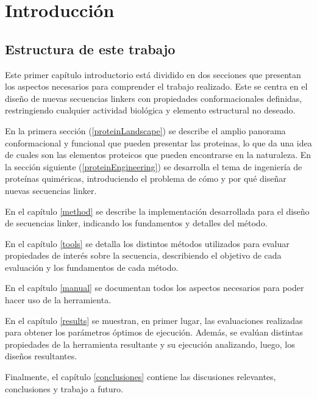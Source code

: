 \chapter{Introducci\'on}



\section{Estructura de este trabajo}

Este primer capítulo introductorio está dividido en dos secciones que presentan los aspectos necesarios para comprender el trabajo realizado. Este se centra en el diseño de nuevas secuencias linkers 
con propiedades conformacionales definidas, restringiendo cualquier actividad biológica y elemento estructural no deseado.

En la primera sección (\ref{proteinLandscape}) se describe el amplio panorama conformacional y funcional que pueden presentar las proteinas, lo que da una idea de cuales son las elementos proteicos que pueden encontrarse en la naturaleza.
En la sección siguiente (\ref{proteinEngineering}) se desarrolla el tema de ingeniería de proteínas quiméricas, introduciendo el problema de cómo y por qué diseñar nuevas secuencias linker.

En el capítulo \ref{method} se describe la implementación desarrollada para el diseño de secuencias linker, indicando los fundamentos y detalles del método.

En el capítulo \ref{tools} se detalla los distintos métodos utilizados para evaluar propiedades de interés sobre la secuencia, describiendo el objetivo de cada evaluación y los fundamentos de cada método. 

En el capítulo \ref{manual} se documentan todos los aspectos necesarios para poder hacer uso de la herramienta.

En el capítulo \ref{results} se muestran, en primer lugar, las evaluaciones realizadas para obtener los parámetros óptimos de ejecución. 
Además, se evalúan distintas propiedades de la herramienta resultante y su ejecución analizando, luego, los diseños resultantes. 

Finalmente, el capítulo \ref{conclusiones} contiene las discusiones relevantes, conclusiones y trabajo a futuro.






